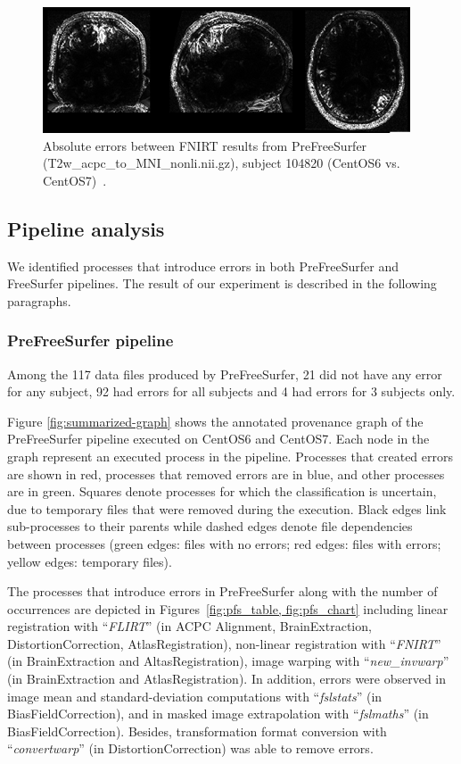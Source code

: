 \documentclass{article}
\begin{document}
{\begin{figure}[H]
\centering
  \includegraphics[scale=0.6]{images/fnirt_result.png} 
  \caption{Absolute errors between FNIRT results from PreFreeSurfer 
  (T2w\_acpc\_to\_MNI\_nonli.nii.gz), subject 104820 (CentOS6 vs. 
  CentOS7)~\cite{Scaria2017}. } 
  \label{fig:fnirt_result}
\end{figure}



\subsection{Pipeline analysis}

We identified processes that introduce errors in both PreFreeSurfer and 
FreeSurfer pipelines. The result of our experiment is described in the 
following paragraphs.

\subsubsection{PreFreeSurfer pipeline} 

Among the 117 data files produced by 
PreFreeSurfer, 21 did not have any error for any subject, 92 had errors 
for all subjects and 4 had errors for 3 subjects only. 

Figure \ref{fig:summarized-graph} shows the annotated provenance graph 
of the PreFreeSurfer pipeline executed on CentOS6 and CentOS7. Each 
node in the graph represent an executed process in the pipeline. 
Processes that created errors are shown in red, processes that removed 
errors are in blue, and other processes are in green.  Squares denote 
processes for which the classification is uncertain, due to temporary 
files that were removed during the execution. Black edges link 
sub-processes to their parents while dashed edges denote file 
dependencies between processes (green edges: files with no errors; red 
edges: files with errors; yellow edges: temporary files).

The processes that introduce errors in PreFreeSurfer along with the 
number of occurrences are depicted in Figures~\ref{fig:pfs_table, 
fig:pfs_chart} including linear registration with “\emph{FLIRT}” (in 
ACPC Alignment, BrainExtraction, DistortionCorrection, 
AtlasRegistration), non-linear registration with “\emph{FNIRT}” (in 
BrainExtraction and AltasRegistration), image warping with 
“\emph{new\_invwarp}” (in BrainExtraction and AtlasRegistration).  In 
addition, errors were observed in image mean and standard-deviation 
computations with “\emph{fslstats}” (in BiasFieldCorrection), and in 
masked image extrapolation with “\emph{fslmaths}” (in 
BiasFieldCorrection).  Besides, transformation format conversion with 
“\emph{convertwarp}” (in DistortionCorrection) was able to remove 
errors.

}
\end{document}
